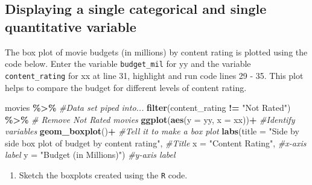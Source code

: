 \documentclass[
]{report}
\newenvironment{Shaded}{\begin{snugshade}}{\end{snugshade}}
\newcommand{\CommentTok}[1]{\textcolor[rgb]{0.56,0.35,0.01}{\textit{#1}}}
\newcommand{\DataTypeTok}[1]{\textcolor[rgb]{0.13,0.29,0.53}{#1}}
\newcommand{\KeywordTok}[1]{\textcolor[rgb]{0.13,0.29,0.53}{\textbf{#1}}}
\newcommand{\NormalTok}[1]{#1}
\newcommand{\OperatorTok}[1]{\textcolor[rgb]{0.81,0.36,0.00}{\textbf{#1}}}
\newcommand{\StringTok}[1]{\textcolor[rgb]{0.31,0.60,0.02}{#1}}
\providecommand{\tightlist}{%
  \setlength{\itemsep}{0pt}\setlength{\parskip}{0pt}}
\begin{document}
\vspace{1.5in}

\hypertarget{displaying-a-single-categorical-and-single-quantitative-variable}{%
\subsection*{Displaying a single categorical and single quantitative variable}\label{displaying-a-single-categorical-and-single-quantitative-variable}}

The box plot of movie budgets (in millions) by content rating is plotted using the code below. Enter the variable \texttt{budget\_mil} for yy and the variable \texttt{content\_rating} for xx at line 31, highlight and run code lines 29 - 35. This plot helps to compare the budget for different levels of content rating.

\begin{Shaded}
\begin{Highlighting}[]
\NormalTok{movies }\OperatorTok{\%\textgreater{}\%}\StringTok{  }\CommentTok{\#Data set piped into...}
\StringTok{  }\KeywordTok{filter}\NormalTok{(content\_rating }\OperatorTok{!=}\StringTok{ "Not Rated"}\NormalTok{) }\OperatorTok{\%\textgreater{}\%}\StringTok{ }\CommentTok{\# Remove Not Rated movies}
\StringTok{  }\KeywordTok{ggplot}\NormalTok{(}\KeywordTok{aes}\NormalTok{(}\DataTypeTok{y =}\NormalTok{ yy, }\DataTypeTok{x =}\NormalTok{ xx))}\OperatorTok{+}\StringTok{  }\CommentTok{\#Identify variables}
\StringTok{  }\KeywordTok{geom\_boxplot}\NormalTok{()}\OperatorTok{+}\StringTok{  }\CommentTok{\#Tell it to make a box plot}
\StringTok{  }\KeywordTok{labs}\NormalTok{(}\DataTypeTok{title =} \StringTok{"Side by side box plot of budget by content rating"}\NormalTok{,  }\CommentTok{\#Title}
       \DataTypeTok{x =} \StringTok{"Content Rating"}\NormalTok{,    }\CommentTok{\#x{-}axis label}
       \DataTypeTok{y =} \StringTok{"Budget (in Millions)"}\NormalTok{)  }\CommentTok{\#y{-}axis label}
\end{Highlighting}
\end{Shaded}

\begin{enumerate}
\def\labelenumi{\arabic{enumi}.}
\setcounter{enumi}{12}
\tightlist
\item
  Sketch the boxplots created using the \texttt{R} code.
\end{enumerate}

\vspace{1.5in}
\end{document}
